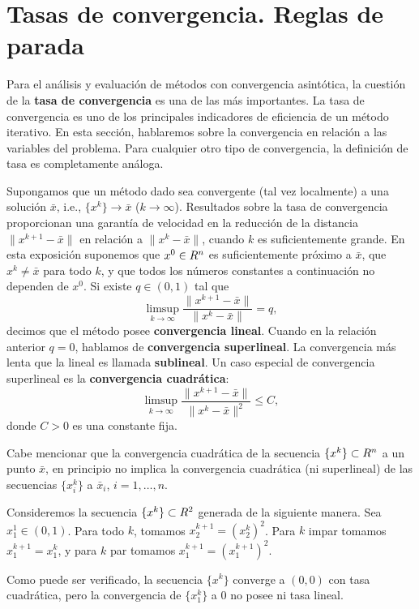 
\section{Tasas de convergencia. Reglas de parada}

Para el análisis y evaluación de métodos con convergencia asintótica, la cuestión de la \textbf{tasa de convergencia} es una de las más importantes. La tasa de convergencia es uno de los principales indicadores de eficiencia de un método iterativo. En esta sección, hablaremos sobre la convergencia en relación a las variables del problema. Para cualquier otro tipo de convergencia, la definición de tasa es completamente análoga.

Supongamos que un método dado sea convergente (tal vez localmente) a una solución $\bar{x}$, i.e., $\{x^k\} \to \bar{x}$ ($k \to \infty$). Resultados sobre la tasa de convergencia proporcionan una garantía de velocidad en la reducción de la distancia $\|x^{k+1} - \bar{x}\|$ en relación a $\|x^k - \bar{x}\|$, cuando $k$ es suficientemente grande. En esta exposición suponemos que $x^0 \in R^n$ es suficientemente próximo a $\bar{x}$, que $x^k \neq \bar{x}$ para todo $k$, y que todos los números constantes a continuación no dependen de $x^0$. Si existe $q \in (0, 1)$ tal que
\[
    \limsup_{k \to \infty} \frac{\|x^{k+1} - \bar{x}\|}{\|x^k - \bar{x}\|} = q,
\]
decimos que el método posee \textbf{convergencia lineal}. Cuando en la relación anterior $q = 0$, hablamos de \textbf{convergencia superlineal}. La convergencia más lenta que la lineal es llamada \textbf{sublineal}. Un caso especial de convergencia superlineal es la \textbf{convergencia cuadrática}:
\[
    \limsup_{k \to \infty} \frac{\|x^{k+1} - \bar{x}\|}{\|x^k - \bar{x}\|^2} \le C,
\]
donde $C > 0$ es una constante fija.

Cabe mencionar que la convergencia cuadrática de la secuencia $\{x^k\} \subset R^n$ a un punto $\bar{x}$, en principio no implica la convergencia cuadrática (ni superlineal) de las secuencias $\{x_i^k\}$ a $\bar{x}_i$, $i = 1, \dots, n$.

\begin{example}\label{v2:exa:2.2.1}
    Consideremos la secuencia $\{x^k\} \subset R^2$ generada de la siguiente manera. Sea $x_1^1 \in (0, 1)$. Para todo $k$, tomamos $x_2^{k+1} = (x_2^k)^2$. Para $k$ impar tomamos $x_1^{k+1} = x_1^k$, y para $k$ par tomamos $x_1^{k+1} = (x_1^{k+1})^2$.
    
    Como puede ser verificado, la secuencia $\{x^k\}$ converge a $(0, 0)$ con tasa cuadrática, pero la convergencia de $\{x_1^k\}$ a $0$ no posee ni tasa lineal.
\end{example}

